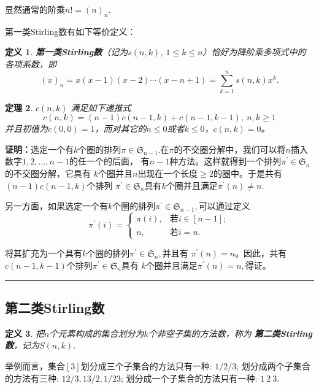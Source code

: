\documentclass[a4paper,11pt]{article}
\newtheorem{thm}{定理}[section]
\newtheorem{defi}[thm]{定义}
\def\qed{\nopagebreak\hfill{\rule{4pt}{7pt}}\medbreak}
\begin{document}
显然通常的阶乘$n!=(n)_n.$

第一类Stirling数有如下等价定义：

\begin{defi}
{\bf 第一类Stirling数}（记为$s(n,k)$, $1\leq k\leq
n$）恰好为降阶乘多项式中的各项系数，即
\begin{equation}
(x)_n=x(x-1)(x-2)\cdots(x-n+1)=\sum_{k=1}^n{s(n,k)x^k}.
\end{equation}
\end{defi}

\begin{thm}
$c(n,k)$ 满足如下递推式
$$c(n,k)=(n-1)c(n-1,k)+c(n-1,k-1),\  n,k\geq 1$$
并且初值为$c(0,0)=1$，而对其它的$n\leq 0$或者$k\leq 0$，$c(n,k)=0$。
\end{thm}

{\bf 证明：}选定一个有$k$个圈的排列$\pi\in\mathfrak{S}_{n-1}.$在$
\pi$的不交圈分解中，我们可以将$n$插入数字$1,2,\ldots,n-1$的任一个的后面，
有$n-1$种方法。这样就得到一个排列$\pi^{'}\in\mathfrak{S}_n$的不交圈分解，它具有
$k$个圈并且$n$出现在一个长度$\geq
2$的圈中。于是共有$(n-1)c(n-1,k)$个排列
$\pi^{'}\in\mathfrak{S}_n$具有$k$个圈并且满足$\pi^{'}(n)\neq n.$

另一方面，如果选定一个有$k$个圈的排列$\pi^{'}\in\mathfrak{S}_{n-1},$可以通过定义
  $$\pi^{'}(i)=\left\{\begin{array}{ll}
                          \pi(i), & \mbox{若}i\in[n-1]; \\
                          n, &\mbox{若} i=n.
                        \end{array}\right.
    $$

将其扩充为一个具有$k$个圈的排列$\pi^{'}\in\mathfrak{S}_n,$并且有
$\pi^{'}(n)=n$。因此，共有$c(n-1,k-1)$个排列$\pi^{'}\in\mathfrak{S}_n$具有
$k$个圈并且满足$\pi^{'}(n)=n,$得证。\qed

\subsection{第二类Stirling数}
\begin{defi}
把$n$个元素构成的集合划分为$k$个非空子集的方法数，称为{\bf
第二类Stirling数}，记为$S(n,k)$.
\end{defi}

举例而言，集合$[3]$划分成三个子集合的方法只有一种: $1/2/3$;
划分成两个子集合的方法有三种: $12/3,13/2,1/23$;
划分成一个子集合的方法只有一种: $1\ 2\ 3$.
\end{document}
